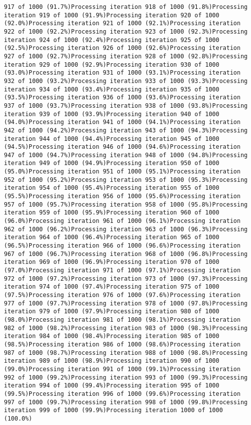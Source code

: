\documentclass[
]{article}
\begin{document}
\begin{verbatim}
917 of 1000 (91.7%)Processing iteration 918 of 1000 (91.8%)Processing iteration 919 of 1000 (91.9%)Processing iteration 920 of 1000 (92.0%)Processing iteration 921 of 1000 (92.1%)Processing iteration 922 of 1000 (92.2%)Processing iteration 923 of 1000 (92.3%)Processing iteration 924 of 1000 (92.4%)Processing iteration 925 of 1000 (92.5%)Processing iteration 926 of 1000 (92.6%)Processing iteration 927 of 1000 (92.7%)Processing iteration 928 of 1000 (92.8%)Processing iteration 929 of 1000 (92.9%)Processing iteration 930 of 1000 (93.0%)Processing iteration 931 of 1000 (93.1%)Processing iteration 932 of 1000 (93.2%)Processing iteration 933 of 1000 (93.3%)Processing iteration 934 of 1000 (93.4%)Processing iteration 935 of 1000 (93.5%)Processing iteration 936 of 1000 (93.6%)Processing iteration 937 of 1000 (93.7%)Processing iteration 938 of 1000 (93.8%)Processing iteration 939 of 1000 (93.9%)Processing iteration 940 of 1000 (94.0%)Processing iteration 941 of 1000 (94.1%)Processing iteration 942 of 1000 (94.2%)Processing iteration 943 of 1000 (94.3%)Processing iteration 944 of 1000 (94.4%)Processing iteration 945 of 1000 (94.5%)Processing iteration 946 of 1000 (94.6%)Processing iteration 947 of 1000 (94.7%)Processing iteration 948 of 1000 (94.8%)Processing iteration 949 of 1000 (94.9%)Processing iteration 950 of 1000 (95.0%)Processing iteration 951 of 1000 (95.1%)Processing iteration 952 of 1000 (95.2%)Processing iteration 953 of 1000 (95.3%)Processing iteration 954 of 1000 (95.4%)Processing iteration 955 of 1000 (95.5%)Processing iteration 956 of 1000 (95.6%)Processing iteration 957 of 1000 (95.7%)Processing iteration 958 of 1000 (95.8%)Processing iteration 959 of 1000 (95.9%)Processing iteration 960 of 1000 (96.0%)Processing iteration 961 of 1000 (96.1%)Processing iteration 962 of 1000 (96.2%)Processing iteration 963 of 1000 (96.3%)Processing iteration 964 of 1000 (96.4%)Processing iteration 965 of 1000 (96.5%)Processing iteration 966 of 1000 (96.6%)Processing iteration 967 of 1000 (96.7%)Processing iteration 968 of 1000 (96.8%)Processing iteration 969 of 1000 (96.9%)Processing iteration 970 of 1000 (97.0%)Processing iteration 971 of 1000 (97.1%)Processing iteration 972 of 1000 (97.2%)Processing iteration 973 of 1000 (97.3%)Processing iteration 974 of 1000 (97.4%)Processing iteration 975 of 1000 (97.5%)Processing iteration 976 of 1000 (97.6%)Processing iteration 977 of 1000 (97.7%)Processing iteration 978 of 1000 (97.8%)Processing iteration 979 of 1000 (97.9%)Processing iteration 980 of 1000 (98.0%)Processing iteration 981 of 1000 (98.1%)Processing iteration 982 of 1000 (98.2%)Processing iteration 983 of 1000 (98.3%)Processing iteration 984 of 1000 (98.4%)Processing iteration 985 of 1000 (98.5%)Processing iteration 986 of 1000 (98.6%)Processing iteration 987 of 1000 (98.7%)Processing iteration 988 of 1000 (98.8%)Processing iteration 989 of 1000 (98.9%)Processing iteration 990 of 1000 (99.0%)Processing iteration 991 of 1000 (99.1%)Processing iteration 992 of 1000 (99.2%)Processing iteration 993 of 1000 (99.3%)Processing iteration 994 of 1000 (99.4%)Processing iteration 995 of 1000 (99.5%)Processing iteration 996 of 1000 (99.6%)Processing iteration 997 of 1000 (99.7%)Processing iteration 998 of 1000 (99.8%)Processing iteration 999 of 1000 (99.9%)Processing iteration 1000 of 1000 (100.0%)

\end{verbatim}
\end{document}
